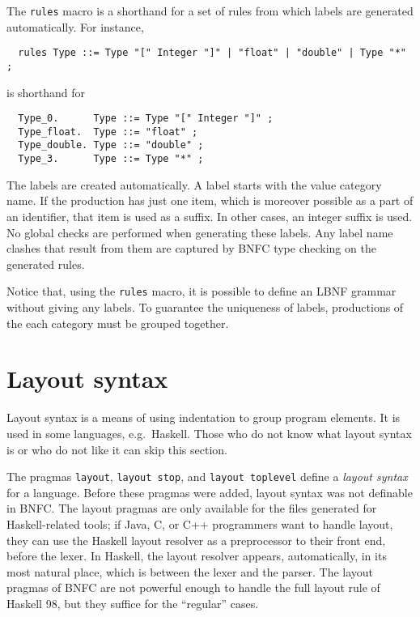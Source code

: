 \documentclass[10pt]{article}
\begin{document}
The \verb$rules$ macro is a shorthand for a set of rules from which
labels are generated automatically. For instance,
\begin{verbatim}
  rules Type ::= Type "[" Integer "]" | "float" | "double" | Type "*" ;
\end{verbatim}
is shorthand for
\begin{verbatim}
  Type_0.      Type ::= Type "[" Integer "]" ;
  Type_float.  Type ::= "float" ; 
  Type_double. Type ::= "double" ; 
  Type_3.      Type ::= Type "*" ;
\end{verbatim}
The labels are created automatically. A label starts with 
the value category name. If the 
production has just one item, which is moreover
possible as a part of an identifier, that item is
used as a suffix.
In other cases, an integer suffix is used. No global checks are
performed when generating these labels. Any label name clashes that
result from them are captured by BNFC type checking on the generated
rules.

Notice that, using the \verb$rules$ macro, it is possible to define an
LBNF grammar without giving any labels. To guarantee the uniqueness
of labels, productions of the each category must be grouped together.



\section{Layout syntax}
\label{layout}

Layout syntax is a means of using indentation to group
program elements. It is used in some languages, e.g.\ Haskell.
Those who do not know what layout syntax is or who do not like
it can skip this section. 

The pragmas {\tt layout}, {\tt layout stop}, and {\tt layout toplevel}
define a {\em layout syntax} for a language.
Before these pragmas were added, layout syntax was not definable in
BNFC. The layout pragmas are only
available for the files generated for Haskell-related tools;
if Java, C, or C++ programmers want to handle layout, they can use
the Haskell layout resolver as a preprocessor to their
front end, before the lexer. In Haskell, the layout resolver 
appears, automatically, in its most natural place, which is between the
lexer and the parser. The layout pragmas of BNFC are not
powerful enough to handle the full layout rule of Haskell 98,
but they suffice for the ``regular'' cases.
\end{document}
